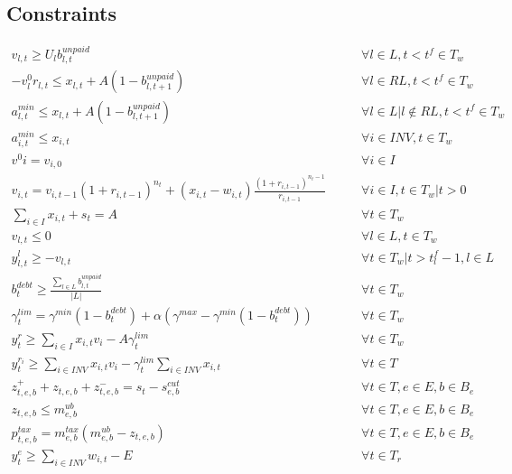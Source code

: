 \documentclass[11pt]{article}
\begin{document}
\subsection{Constraints}
\begin{align}
    v_{l, t} \geq U_{l} b^{unpaid}_{l, t} & \qquad \forall l \in L , t < t^f \in T_w \\
    -v^{0}_{l} r_{l, t} \leq x_{l, t} + A (1 - b^{unpaid}_{l, t+1}) & \qquad \forall l \in RL , t < t^f \in T_w \\
    a^{min}_{l, t} \leq x_{l, t} + A (1 - b^{unpaid}_{l, t+1}) & \qquad \forall l \in L | l \notin RL  , t < t^f \in T_w \\
    a^{min}_{i, t} \leq x_{i, t} & \qquad \forall i \in INV, t \in T_w \\
    v^{0}{i} = v_{i, 0} & \qquad \forall i \in I \\
    v_{i, t} = v_{i, t-1} (1 + r_{i, t-1})^{n_t} + (x_{i, t} - w_{i, t}) \frac{(1 + r_{i, t-1})^{n_t-1}} {r_{i, t-1}} & \qquad \forall i \in I, t \in T_w| t > 0  \\
    \sum_{i \in I} x_{i, t} + s_t = A & \qquad \forall t \in T_w \\
    v_{l, t} \leq 0 & \qquad \forall l \in L, t \in T_w \\
    y^{l}_{l, t} \geq -v_{l, t} & \qquad \forall t \in T_w| t > t^f_l - 1, l \in L  \\
    b^{debt}_{t} \geq \frac{ \sum_{l \in L} b^{unpaid}_{l, t} } { |L| } & \qquad \forall t \in T_w \\
    \gamma^{lim}_t = \gamma^{min} (1 - b^{debt}_t) + \alpha (\gamma^{max} - \gamma^{min} (1 - b^{debt}_t)) & \qquad \forall t \in T_w \\
    y^{r}_{t} \geq \sum_{i \in I} x_{i, t} v_{i} - A \gamma^{lim}_t & \qquad \forall t \in T_w \\
    y^{r_i}_{t} \geq \sum_{i \in INV} x_{i, t} v_{i} - \gamma^{lim}_t \sum_{i \in INV} x_{i, t} & \qquad \forall t \in T \\
    z^+_{t, e, b} + z_{t, e, b} + z^-_{t, e, b} = s_t - s^{cut}_{e, b} & \qquad \forall t \in T, e \in E, b \in B_e \\
    z_{t, e, b} \leq m^{ub}_{e, b} & \qquad \forall t \in T, e \in E, b \in B_e \\
    p^{tax}_{t, e, b} = m^{tax}_{e, b} (m^{ub}_{e, b}- z_{t, e, b}) & \qquad \forall t \in T, e \in E, b \in B_e \\
    y^{e}_{t} \geq \sum_{i \in INV} w_{i, t} - E & \qquad \forall t \in T_r
\end{align}
\end{document}
